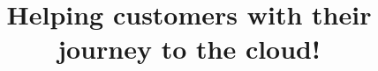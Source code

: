 \documentclass[11pt,a4paper,sans]{moderncv}                 %
\title{Helping customers with their journey to the cloud!}
\begin{document}
\makecvtitle


\end{document}
